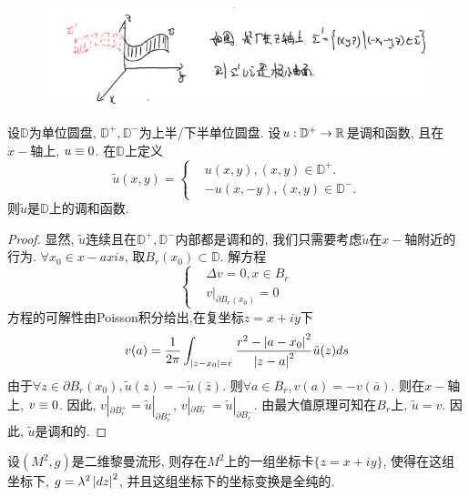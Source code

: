 \begin{figure}[h]
	\centering
	\includegraphics[scale=0.5]{images/reflection1.png}
	\caption{}
	\label{reflection1}
\end{figure}

\begin{lemma}
    设$\mathbb{D}$为单位圆盘, $\mathbb{D}^+,\mathbb{D}^-$为上半/下半单位圆盘. 设$u: \mathbb{D}^+ \to \mathbb{R}$是调和函数, 且在$x-$轴上, $u\equiv 0$. 在$\mathbb{D}$上定义
    \begin{equation}
        \tilde{u}(x,y)= \left\{
            \begin{aligned}
                &u(x,y), (x,y) \in \mathbb{D}^+.\\
                &-u(x,-y), (x,y) \in \mathbb{D}^-.
            \end{aligned}
        \right.
    \end{equation}
    则$\tilde{u}$是$\mathbb{D}$上的调和函数.
\end{lemma}
\begin{proof}
    显然, $\tilde{u}$连续且在$\mathbb{D}^+,\mathbb{D}^-$内部都是调和的, 我们只需要考虑$\tilde{u}$在$x-$轴附近的行为. $\forall x_0 \in x-axis$, 取$B_r(x_0) \subset \mathbb{D}$. 解方程
    \begin{equation}
        \left\{
            \begin{aligned}
                &\Delta v=0, x \in B_r\\
                & v|_{\partial B_r(x_0)}=0
            \end{aligned}
        \right.
    \end{equation}
    方程的可解性由Poisson积分给出,在复坐标$z=x+iy$下
    \begin{equation}
        v(a)=\frac{1}{2\pi} \int_{\left | z-x_0 \right |=r} \frac{r^2-\left | a-x_0 \right |^2}{\left | z-a \right |^2}\tilde{u}(z)ds
    \end{equation}
    由于$\forall z \in \partial B_r(x_0), \tilde{u}(z)=-\tilde{u}(\bar{z})$. 则$\forall a\in B_r, v(a)=-v(\bar{a})$. 则在$x-$轴上, $v\equiv 0$. 因此, $v|_{\partial{B_r^+}}=\tilde{u}|_{\partial{B_r^+}}$, $v|_{\partial{B_r^-}}=\tilde{u}|_{\partial{B_r^-}}$. 由最大值原理可知在$B_r$上, $\tilde{u}=v$. 因此, $\tilde{u}$是调和的.
\end{proof}
\begin{lemma}[等温坐标的存在性]
    设$(M^2, g)$是二维黎曼流形, 则存在$M^2$上的一组坐标卡$\{z=x+iy\}$, 使得在这组坐标下, $g=\lambda^2\left | dz \right |^2$, 并且这组坐标下的坐标变换是全纯的.
\end{lemma}

